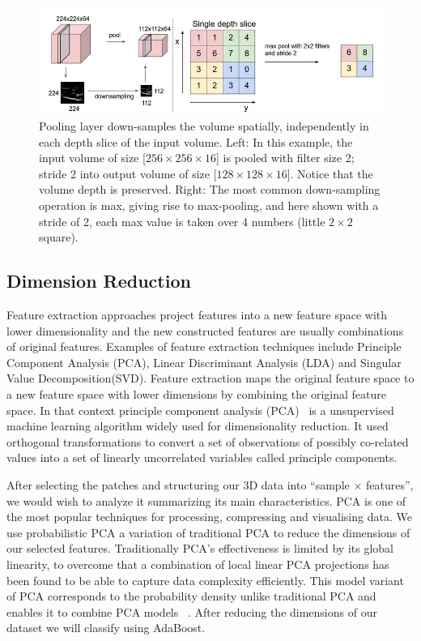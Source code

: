 \begin{centering}
	\begin{figure}
		\centering
		\includegraphics[width=\linewidth]{figures/maxpooling2.png}
		\caption[Maxpooling and Downsampeling.]{Pooling layer down-samples the volume spatially, independently in each depth slice of the input volume. Left: In this example, the input volume of size [$256\times256\times16$] is pooled with filter size 2; stride 2 into output volume of size [$128\times128\times16$]. Notice that the volume depth is preserved. Right: The most common down-sampling operation is max, giving rise to max-pooling, and here shown with a stride of 2, each max value is taken over 4 numbers (little $2\times2$ square).}
		\label{fig:maxpooling}
	\end{figure}
\end{centering}

\subsection{Dimension Reduction}
Feature extraction approaches project features into a new feature space with lower dimensionality and the new constructed features are usually combinations of original features. Examples of feature extraction techniques include Principle Component Analysis (PCA), Linear Discriminant Analysis (LDA) and Singular Value Decomposition(SVD). Feature extraction maps the original feature space to a new feature space with lower dimensions by combining the original feature space. In that context principle component analysis (PCA)~\citep{jolliffe2002principal} is a unsupervised machine learning algorithm widely used for dimensionality reduction. It used orthogonal transformations to convert a set of observations of possibly co-related values into a set of linearly uncorrelated variables called principle components. 

After selecting the patches and structuring our 3D data into ``sample $ \times $ features'', we would wish to analyze it summarizing its main characteristics. PCA is one of the most popular techniques for processing, compressing and visualising data. We use probabilistic PCA a variation of traditional PCA to reduce the dimensions of our selected features. Traditionally PCA's effectiveness is limited by its global linearity, to overcome that a combination of local linear PCA projections has been found to be able to capture data complexity efficiently. This model variant of PCA corresponds to the probability density unlike traditional PCA and enables it to combine PCA models~ \citep{tipping1999mixtures}. After reducing the dimensions of our dataset we will classify using AdaBoost. 


